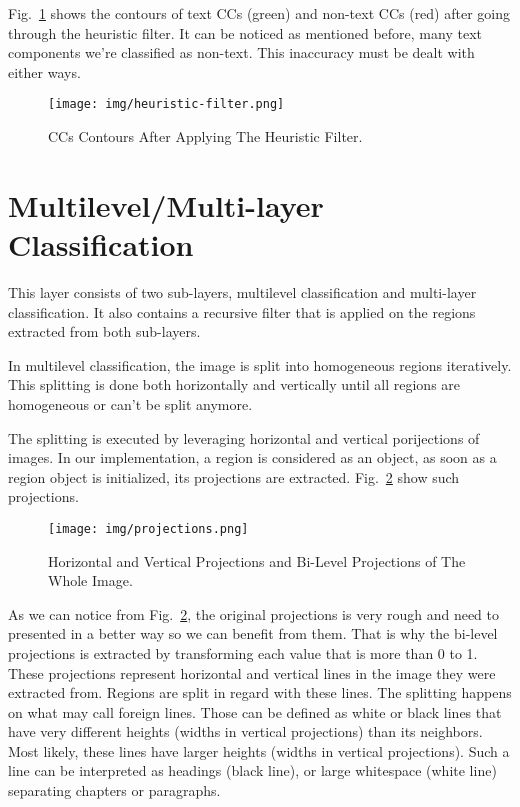 \documentclass[12pt]{report}
\begin{document}
    Fig.~\ref{img:heuristic-filter} shows the contours of text CCs (green) and non-text CCs (red) after going through the heuristic filter.
    It can be noticed as mentioned before, many text components we're classified as non-text.
    This inaccuracy must be dealt with either ways.

    \begin{figure}[htbp]
        \centerline{\texttt{[image: img/heuristic-filter.png]}}
        \caption{CCs Contours After Applying The Heuristic Filter.}
        \label{img:heuristic-filter}
    \end{figure}


    \section{Multilevel/Multi-layer Classification}

    This layer consists of two sub-layers, multilevel classification and multi-layer classification.
    It also contains a recursive filter that is applied on the regions extracted from both sub-layers.

    In multilevel classification, the image is split into homogeneous regions iteratively.
    This splitting is done both horizontally and vertically until all regions are homogeneous or can't
    be split anymore.

    The splitting is executed by leveraging horizontal and vertical porijections of images. In our
    implementation, a region is considered as an object, as soon as a region object is initialized,
    its projections are extracted. Fig.~\ref{img:projections} show such projections.

    \begin{figure}[htbp]
        \centerline{\texttt{[image: img/projections.png]}}
        \caption{Horizontal and Vertical Projections and Bi-Level Projections of The Whole Image.}
        \label{img:projections}
    \end{figure}

    As we can notice from Fig.~\ref{img:projections}, the original projections is very rough and need to
    presented in a better way so we can benefit from them.
    That is why the bi-level projections is extracted by transforming each value that is more than 0 to 1.
    These projections represent horizontal and vertical lines in the image they were extracted from.
    Regions are split in regard with these lines. The splitting happens on what may call foreign lines.
    Those can be defined as white or black lines that have very different heights (widths in vertical projections)
    than its neighbors. Most likely, these lines have larger heights (widths in vertical projections). Such a line
    can be interpreted as headings (black line), or large whitespace (white line) separating chapters or paragraphs.
\end{document}
